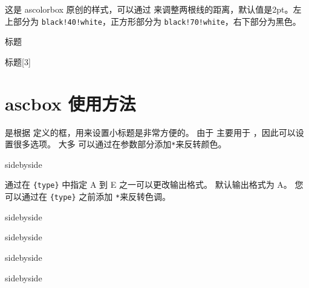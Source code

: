 \documentclass[fontset=none]{ctexart}
\begin{document}
	这是 ascolorbox 原创的样式，可以通过  来调整两根线的距离，默认值是2pt。左上部分为 \verb|black!40!white|，正方形部分为 \verb|black!70!white|，右下部分为黑色。
	
	\begin{dispExample}
		\begin{ascolorbox19}[子标题]{标题}
			\zhlipsum[1]
		\end{ascolorbox19}
	\end{dispExample}
	
	\begin{dispExample}
		\begin{ascolorbox19}[子标题]{标题}[3]
			\zhlipsum[1]
		\end{ascolorbox19}
	\end{dispExample}
	
	\section{ascbox 使用方法}
	
	 是根据 定义的框，用来设置小标题是非常方便的。 由于  主要用于 ，因此可以设置很多选项。 大多 可以通过在参数部分添加\verb|*|来反转颜色。
	\begin{dispExample*}{sidebyside}
		
	\end{dispExample*}
	
	
	通过在 \verb|{type}| 中指定 A 到 E 之一可以更改输出格式。 默认输出格式为 A。 您可以通过在 \verb|{type}| 之前添加 \verb|*|来反转色调。
	\begin{dispExample*}{sidebyside}
		
	\end{dispExample*}
	
	
	
	\begin{dispExample*}{sidebyside}
		
	\end{dispExample*}
	\begin{dispExample*}{sidebyside}
		
	\end{dispExample*}
	\begin{dispExample*}{sidebyside}
		
	\end{dispExample*}
	
\end{document}
